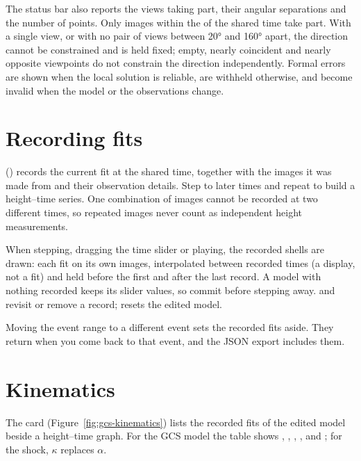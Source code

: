 The status bar also reports the views taking part, their angular separations and the number
of points. Only images within the  of the shared time take part. With a
single view, or with no pair of views between 20° and 160° apart, the direction cannot be
constrained and is held fixed; empty, nearly coincident and nearly opposite viewpoints do not
constrain the direction independently. Formal errors are shown when the local solution is
reliable, are withheld otherwise, and become invalid when the model or the observations
change.

\section{Recording fits}
\label{sec:gcs-recording}

 () records the current fit at the shared time, together with
the images it was made from and their observation details. Step to later times and repeat to
build a height--time series. One combination of images cannot be recorded at two different
times, so repeated images never count as independent height measurements.

When stepping, dragging the time slider or playing, the recorded shells are drawn: each fit on
its own images, interpolated between recorded times (a display, not a fit) and held before the
first and after the last record. A model with nothing recorded keeps its slider values, so
commit before stepping away.  and
 revisit or remove a record;  resets the edited model.

Moving the event range to a different event sets the recorded fits aside. They return when you
come back to that event, and the JSON export includes them.

\section{Kinematics}
\label{sec:gcs-kinematics}

The  card (Figure~\ref{fig:gcs-kinematics}) lists the recorded fits of the
edited model beside a height--time graph. For the GCS model the table shows ,
, , ,  and ; for the shock,
\(\kappa\) replaces \(\alpha\).

